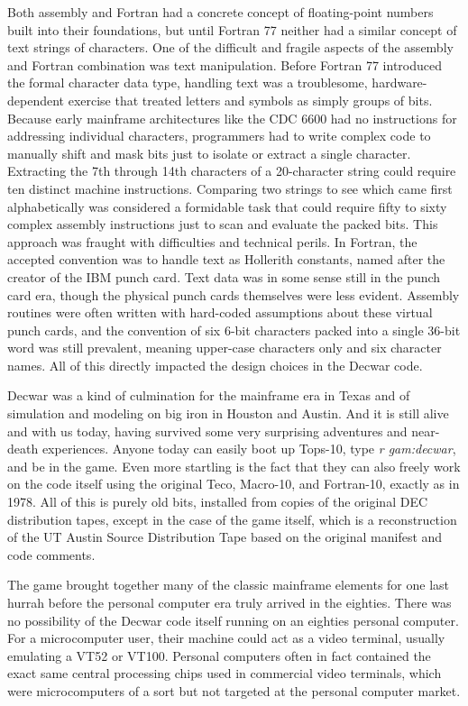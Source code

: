 Both assembly and Fortran had a concrete concept of floating-point numbers built into their foundations, but until Fortran 77 neither had a similar concept of text strings of characters. One of the difficult and fragile aspects of the assembly and Fortran combination was text manipulation. Before Fortran 77 introduced the formal character data type, handling text was a troublesome, hardware-dependent exercise that treated letters and symbols as simply groups of bits. Because early mainframe architectures like the CDC 6600 had no instructions for addressing individual characters, programmers had to write complex code to manually shift and mask bits just to isolate or extract a single character. Extracting the 7th through 14th characters of a 20-character string could require ten distinct machine instructions. Comparing two strings to see which came first alphabetically was considered a formidable task that could require fifty to sixty complex assembly instructions just to scan and evaluate the packed bits. This approach was fraught with difficulties and technical perils. In Fortran, the accepted convention was to handle text as Hollerith constants, named after the creator of the IBM punch card. Text data was in some sense still in the punch card era, though the physical punch cards themselves were less evident. Assembly routines were often written with hard-coded assumptions about these virtual punch cards, and the convention of six 6-bit characters packed into a single 36-bit word was still prevalent, meaning upper-case characters only and six character names. All of this directly impacted the design choices in the Decwar code. 

Decwar was a kind of culmination for the mainframe era in Texas and of simulation and modeling on big iron in Houston and Austin. And it is still alive and with us today, having survived some very surprising adventures and near-death experiences. Anyone today can easily boot up Tops-10, type \textit{r gam:decwar}, and be in the game. Even more startling is the fact that they can also freely work on the code itself using the original Teco, Macro-10, and Fortran-10, exactly as in 1978. All of this is purely old bits, installed from copies of the original DEC distribution tapes, except in the case of the game itself, which is a reconstruction of the UT Austin Source Distribution Tape based on the original manifest and code comments.

The game brought together many of the classic mainframe elements for one last hurrah before the personal computer era truly arrived in the eighties. There was no possibility of the Decwar code itself running on an eighties personal computer. For a microcomputer user, their machine could act as a video terminal, usually emulating a VT52 or VT100. Personal computers often in fact contained the exact same central processing chips used in commercial video terminals, which were microcomputers of a sort but not targeted at the personal computer market.

